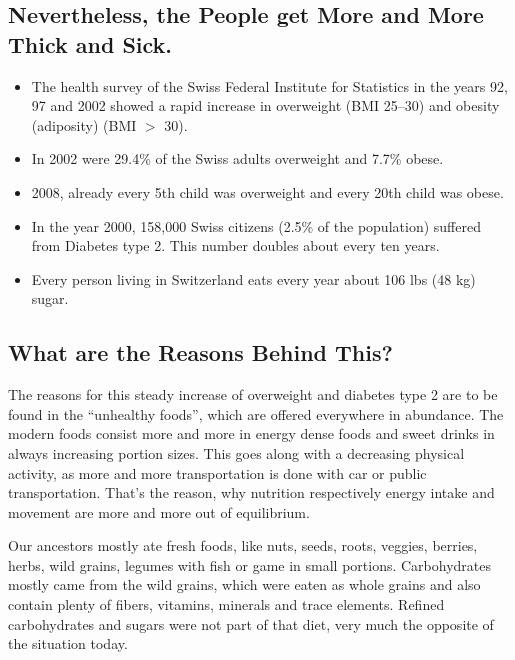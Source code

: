 \documentclass[../main.tex]{subfiles}
\begin{document}
  \subsection{Nevertheless, the People get More and More Thick and Sick.}

  \begin{itemize}
  \item The health survey of the Swiss Federal Institute for Statistics in the years 92, 97 and 2002
    showed a rapid increase in overweight (BMI 25--30) and obesity (adiposity) (BMI $>$ 30).
  \item In 2002 were 29.4\% of the Swiss adults overweight and 7.7\% obese.
  \item 2008, already every 5th child was overweight and every 20th child was obese.
  \item In the year 2000, 158,000 Swiss citizens (2.5\% of the population) suffered from Diabetes type 2. This number doubles about every ten years.
  \item Every person living in Switzerland eats every year about 106 lbs (48 kg) sugar.
  \end{itemize}

\subsection{What are the Reasons Behind This?}  

The reasons for this steady increase of overweight
and diabetes type 2
  are to be found in the ``unhealthy foods'',
which are offered everywhere in abundance.
The modern foods consist more and more in energy dense foods and sweet drinks in always increasing portion sizes.
This goes along with a decreasing physical activity, as more and more transportation is done with car or public transportation.
That's the reason, why nutrition respectively energy intake and movement are more and more out of equilibrium.

Our ancestors mostly ate fresh foods, like nuts, seeds, roots, veggies, berries, herbs, wild grains,
legumes with fish or game in small portions.
Carbohydrates mostly came from the wild grains, which were eaten as whole grains and also contain plenty
of fibers, vitamins, minerals and trace elements.
Refined carbohydrates and sugars were not part of that diet, very much the opposite of the situation today.
\end{document}
